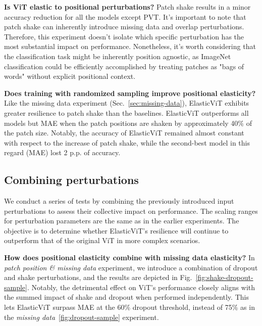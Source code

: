 \documentclass[10pt,twocolumn,letterpaper]{article}
\newcommand{\ours}[0]{ElasticViT\xspace}
\begin{document}
\textbf{Is ViT elastic to positional perturbations?}
Patch shake results in a minor accuracy reduction for all the models except PVT. It's important to note that patch shake can inherently introduce missing data and overlap perturbations. Therefore, this experiment doesn't isolate which specific perturbation has the most substantial impact on performance. Nonetheless, it's worth considering that the classification task might be inherently position agnostic, as ImageNet classification could be efficiently accomplished by treating patches as "bags of words" without explicit positional context.



\textbf{Does training with randomized sampling improve positional elasticity?}
Like the missing data experiment (Sec.~\ref{sec:missing-data}), ElasticViT exhibits greater resilience to patch shake than the baselines. ElasticViT outperforms all models but MAE when the patch positions are shaken by approximately 40\% of the patch size.
Notably, the accuracy of \ours{} remained almost constant with respect to the increase of patch shake, while the second-best model in this regard (MAE) lost 2 p.p. of accuracy. 

\subsection{Combining perturbations} \label{sec:mix-elasticity}
We conduct a series of tests by combining the previously introduced input perturbations to assess their collective impact on performance. The scaling ranges for perturbation parameters are the same as in the earlier experiments. The objective is to determine whether ElasticViT's resilience will continue to outperform that of the original ViT in more complex scenarios.

\textbf{How does positional elasticity combine with missing data elasticity?}
In \textit{patch position \& missing data} experiment, we introduce a combination of dropout and shake perturbations, and the results are depicted in Fig.~\ref{fig:shake-dropout-sample}.
Notably, the detrimental effect on ViT's performance closely aligns with the summed impact of shake and dropout when performed independently.
This lets \ours{} surpass MAE at the 60\% dropout threshold, instead of 75\% as in the \textit{missing data}~\ref{fig:dropout-sample} experiment.
\end{document}
